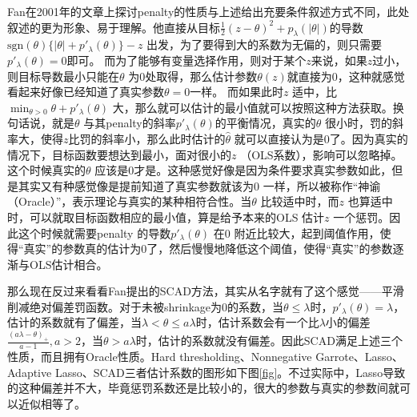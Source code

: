 ﻿\documentclass[hyperref,12pt]{ctexart}
\begin{document}
Fan在2001年的文章上探讨penalty的性质与上述给出充要条件叙述方式不同，此处叙述的更为形象、易于理解。他直接从目标$\frac{1}{2}(z - \theta)^2 + p_{\lambda}(|\theta|)$的导数$\text{sgn}(\theta)\{|\theta| + p'_{\lambda}(\theta)\} - z$ 出发，为了要得到大的系数为无偏的，则只需要$p'_{\lambda}(\theta) = 0$即可。 而为了能够有变量选择作用，则对于某个$z$来说，如果$z$过小，则目标导数最小只能在$\theta$ 为0处取得，那么估计参数$\theta(z)$就直接为0，这种就感觉看起来好像已经知道了真实参数$\theta=0$一样。 而如果此时$z$ 适中，比$\min_{\theta > 0}\theta + p'_{\lambda}(\theta)$ 大，那么就可以估计的最小值就可以按照这种方法获取。换句话说，就是$\theta$ 与其penalty的斜率$p'_{\lambda}(\theta)$的平衡情况，真实的$\theta$ 很小时，罚的斜率大，使得$z$比罚的斜率小，那么此时估计的$\hat{\theta}$ 就可以直接认为是0了。因为真实的情况下，目标函数要想达到最小，面对很小的$z$ （OLS系数），影响可以忽略掉。这个时候真实的$\theta$ 应该是0才是。这种感觉好像是因为条件要求真实参数如此，但是其实又有种感觉像是提前知道了真实参数就该为0 一样，所以被称作“神谕（Oracle）”，表示理论与真实的某种相符合性。当$\theta$ 比较适中时，而$z$ 也算适中时，可以就取目标函数相应的最小值，算是给予本来的OLS 估计$z$ 一个惩罚。因此这个时候就需要penalty 的导数$p'_{\lambda}(\theta)$ 在0 附近比较大，起到阈值作用，使得“真实”的参数真的估计为0了，然后慢慢地降低这个阈值，使得“真实”的参数逐渐与OLS估计相合。


那么现在反过来看看Fan提出的SCAD方法，其实从名字就有了这个感觉——平滑削减绝对偏差罚函数。对于未被shrinkage为0的系数，当$\theta \leq \lambda$时，$p'_{\lambda}(\theta) = \lambda$，估计的系数就有了偏差，当$\lambda < \theta \leq a\lambda$时，估计系数会有一个比$\lambda$小的偏差$\frac{(a\lambda - \theta)_{+}}{a - 1}, a > 2$，当$\theta > a\lambda$时，估计的系数就没有偏差。因此SCAD满足上述三个性质，而且拥有Oracle性质。Hard thresholding、Nonnegative Garrote、Lasso、Adaptive Lasso、SCAD三者估计系数的图形如下图\ref{fig}。不过实际中，Lasso导致的这种偏差并不大，毕竟惩罚系数还是比较小的，很大的参数与真实的参数间就可以近似相等了。
\end{document}
